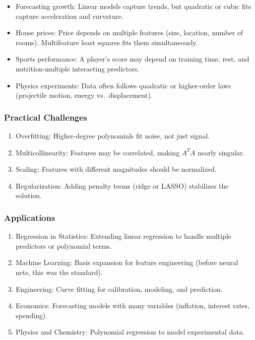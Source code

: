 \documentclass[
  letterpaper,
  DIV=11,
  numbers=noendperiod]{scrreprt}
\providecommand{\tightlist}{%
  \setlength{\itemsep}{0pt}\setlength{\parskip}{0pt}}
\begin{document}
\begin{itemize}
\tightlist
\item
  Forecasting growth: Linear models capture trends, but quadratic or
  cubic fits capture acceleration and curvature.
\item
  House prices: Price depends on multiple features (size, location,
  number of rooms). Multifeature least squares fits them simultaneously.
\item
  Sports performance: A player's score may depend on training time,
  rest, and nutrition-multiple interacting predictors.
\item
  Physics experiments: Data often follows quadratic or higher-order laws
  (projectile motion, energy vs.~displacement).
\end{itemize}

\subsubsection{Practical Challenges}\label{practical-challenges}

\begin{enumerate}
\def\labelenumi{\arabic{enumi}.}
\tightlist
\item
  Overfitting: Higher-degree polynomials fit noise, not just signal.
\item
  Multicollinearity: Features may be correlated, making \(A^T A\) nearly
  singular.
\item
  Scaling: Features with different magnitudes should be normalized.
\item
  Regularization: Adding penalty terms (ridge or LASSO) stabilizes the
  solution.
\end{enumerate}

\subsubsection{Applications}\label{applications-42}

\begin{enumerate}
\def\labelenumi{\arabic{enumi}.}
\tightlist
\item
  Regression in Statistics: Extending linear regression to handle
  multiple predictors or polynomial terms.
\item
  Machine Learning: Basis expansion for feature engineering (before
  neural nets, this was the standard).
\item
  Engineering: Curve fitting for calibration, modeling, and prediction.
\item
  Economics: Forecasting models with many variables (inflation, interest
  rates, spending).
\item
  Physics and Chemistry: Polynomial regression to model experimental
  data.
\end{enumerate}
\end{document}
